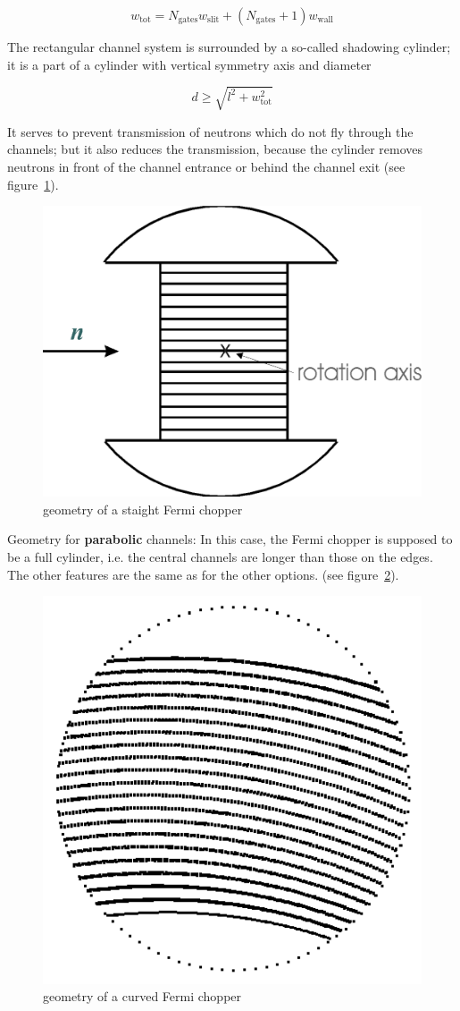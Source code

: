 \begin{equation}
w_\textrm{tot} = N_\textrm{gates} w_\textrm{slit} + (N_\textrm{gates}+1) w_\textrm{wall}
\end{equation}

The rectangular channel system is surrounded by a so-called shadowing cylinder; it is a
part of a cylinder with vertical symmetry axis and diameter

\begin{equation}
d \geq \sqrt{l^2 + w_\textrm{tot}^2}
\end{equation}

It serves to prevent transmission of neutrons which do not fly through the channels;
but it also reduces the transmission, because the cylinder removes neutrons
in front of the channel entrance or behind the channel exit (see figure~\ref{f:vit_fc1}).

\begin{figure}[ht]
\begin{center}
\includegraphics[width=0.45\linewidth]{figures/vitess_fc_str}
\caption{geometry of a staight Fermi chopper\label{f:vit_fc1}}
\end{center}
\end{figure}

Geometry for \textbf{parabolic} channels:
In this case, the Fermi chopper is supposed to be a full cylinder, i.e. the central
channels are longer than those on the edges. The other features are the same as for
the other options. (see figure~\ref{f:vit_fc2}).

\begin{figure}[ht]
\begin{center}
\includegraphics[width=0.4\linewidth]{figures/vitess_fc_parab}
\caption{geometry of a curved Fermi chopper\label{f:vit_fc2}}
\end{center}
\end{figure}

